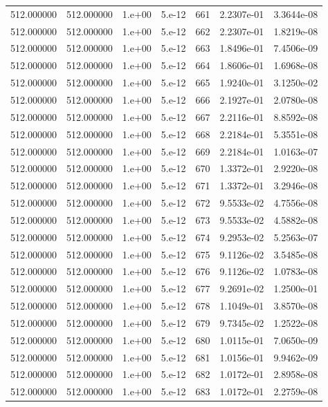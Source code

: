 \begin{table}[htbp]
\begin{tabular}{rrrrrrr}
512.000000 & 512.000000 & 1.e+00 & 5.e-12 & 661 & 2.2307e-01 & 3.3644e-08 \\
512.000000 & 512.000000 & 1.e+00 & 5.e-12 & 662 & 2.2307e-01 & 1.8219e-08 \\
512.000000 & 512.000000 & 1.e+00 & 5.e-12 & 663 & 1.8496e-01 & 7.4506e-09 \\
512.000000 & 512.000000 & 1.e+00 & 5.e-12 & 664 & 1.8606e-01 & 1.6968e-08 \\
512.000000 & 512.000000 & 1.e+00 & 5.e-12 & 665 & 1.9240e-01 & 3.1250e-02 \\
512.000000 & 512.000000 & 1.e+00 & 5.e-12 & 666 & 2.1927e-01 & 2.0780e-08 \\
512.000000 & 512.000000 & 1.e+00 & 5.e-12 & 667 & 2.2116e-01 & 8.8592e-08 \\
512.000000 & 512.000000 & 1.e+00 & 5.e-12 & 668 & 2.2184e-01 & 5.3551e-08 \\
512.000000 & 512.000000 & 1.e+00 & 5.e-12 & 669 & 2.2184e-01 & 1.0163e-07 \\
512.000000 & 512.000000 & 1.e+00 & 5.e-12 & 670 & 1.3372e-01 & 2.9220e-08 \\
512.000000 & 512.000000 & 1.e+00 & 5.e-12 & 671 & 1.3372e-01 & 3.2946e-08 \\
512.000000 & 512.000000 & 1.e+00 & 5.e-12 & 672 & 9.5533e-02 & 4.7556e-08 \\
512.000000 & 512.000000 & 1.e+00 & 5.e-12 & 673 & 9.5533e-02 & 4.5882e-08 \\
512.000000 & 512.000000 & 1.e+00 & 5.e-12 & 674 & 9.2953e-02 & 5.2563e-07 \\
512.000000 & 512.000000 & 1.e+00 & 5.e-12 & 675 & 9.1126e-02 & 3.5485e-08 \\
512.000000 & 512.000000 & 1.e+00 & 5.e-12 & 676 & 9.1126e-02 & 1.0783e-08 \\
512.000000 & 512.000000 & 1.e+00 & 5.e-12 & 677 & 9.2691e-02 & 1.2500e-01 \\
512.000000 & 512.000000 & 1.e+00 & 5.e-12 & 678 & 1.1049e-01 & 3.8570e-08 \\
512.000000 & 512.000000 & 1.e+00 & 5.e-12 & 679 & 9.7345e-02 & 1.2522e-08 \\
512.000000 & 512.000000 & 1.e+00 & 5.e-12 & 680 & 1.0115e-01 & 7.0650e-09 \\
512.000000 & 512.000000 & 1.e+00 & 5.e-12 & 681 & 1.0156e-01 & 9.9462e-09 \\
512.000000 & 512.000000 & 1.e+00 & 5.e-12 & 682 & 1.0172e-01 & 2.8958e-08 \\
512.000000 & 512.000000 & 1.e+00 & 5.e-12 & 683 & 1.0172e-01 & 2.2759e-08 \\

\end{tabular}
\end{table}
